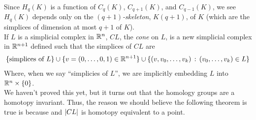 
Since $H_q(K)$ is a function of $C_q(K)$, $C_{q + 1}(K)$, and $C_{q - 1}(K)$, we see $H_q(K)$ depends only on the \emph{$(q + 1)$-skeleton}, $K(q + 1)$, of $K$ (which are the simplices of dimension at most $q + 1$ of $K$).\\

If $L$ is a simplicial complex in $\mathbb{R}^n$, $CL$, the \emph{cone} on $L$, is a new simplicial complex in $\mathbb{R}^{n + 1}$ defined such that the simplices of $CL$ are
\[ \{\text{simplices of } L\} \cup \{v = (0, \ldots, 0, 1) \in \mathbb{R}^{n + 1}\} \cup \{(v, v_0, \ldots, v_k) \, :\, (v_0, \ldots, v_k) \in L\} \]
Where, when we say ``simplicies of $L$'', we are implicitly embedding $L$ into $\mathbb{R}^{n} \times \{0\}$. \\


We haven't proved this yet, but it turns out that the homology groups are a homotopy invariant. Thus, the reason we should believe the following theorem is true is because and $\left\lvert {CL} \right\rvert$ is homotopy equivalent to a point.

